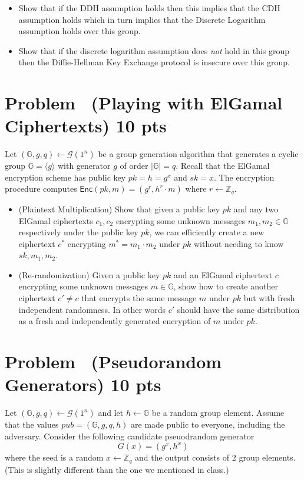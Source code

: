 \documentclass[11pt]{article}
\newcounter{pppp}
\newcommand{\prob}{\arabic{pppp}}  %
\newcommand{\increase}{\addtocounter{pppp}{1}}  %
\newcommand{\newproblem}[2]{\increase
\section*{Problem \prob~(#1) \hfill {#2}}}
\renewcommand{\gets}{\leftarrow}
\newcommand{\Enc}{\mathsf{Enc}}
\newcommand {\ZZ} {\mathbb{Z}}
\def \GroupGen {\mathcal{G}}
\def \G {\mathbb{G}}
\begin{document}
\begin{itemize}
	\item Show that if the DDH assumption holds then this  implies that the CDH assumption holds which in turn implies that the Discrete Logarithm assumption holds over this group. 

	\item Show that if the discrete logarithm assumption does \emph{not} hold in this group then the Diffie-Hellman Key Exchange protocol is insecure over this group.


\end{itemize} 

\newproblem{Playing with ElGamal Ciphertexts}{10 pts}  Let $(\G, g, q) \gets \GroupGen(1^n)$ be a group generation algorithm that generates a cyclic group $\G = \langle g \rangle$ with generator $g$ of order $|\G|=q$. Recall that the ElGamal encryption scheme has public key $pk = h = g^x$ and $sk = x$. The encryption procedure computes $\Enc(pk,m) = (g^r, h^r \cdot m)$ where $r \gets \ZZ_q$.

\begin{itemize}
	\item (Plaintext Multiplication) Show that given a public key $pk$ and any two ElGamal ciphertexts $c_1, c_2$ encrypting some unknown messages $m_1, m_2 \in \G$ respectively under the public key $pk$, we can efficiently create a new  ciphertext $c^*$ encrypting $m^* = m_1 \cdot m_2$ under $pk$ without needing to know  $sk, m_1, m_2$.



		\item(Re-randomization) Given a public key $pk$ and an ElGamal ciphertext $c$ encrypting some unknown messages $m \in \G$, show how to create another ciphertext $c' \neq c$ that encrypts the same message $m$ under $pk$ but with fresh independent randomness.  In other words $c'$ should have the same distribution as a fresh and independently generated encryption of $m$ under $pk$. 


\end{itemize}

\newproblem{Pseudorandom Generators}{10 pts} Let $(\G, g, q) \gets \mathcal{G}(1^n)$ and let $h \gets \G$ be a random group element. Assume that the values $pub = (\G,g,q,h)$ are made public to everyone, including the adversary. Consider the following candidate pseuodrandom generator 
$$G(x) = (g^x, h^x)$$
where the seed is a random $x \gets  \ZZ_q$ and the output consists of 2 group elements. (This is slightly different than the one we mentioned in class.)
\end{document}

